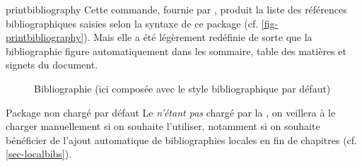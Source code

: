 \begin{docCommand}[doc description=\mandatory]{printbibliography}{}
  Cette commande, fournie par , produit la liste des
  références bibliographiques saisies selon la syntaxe de ce package (cf.
  \vref{fig-printbibliography}). Mais elle a été légèrement redéfinie de sorte
  que la bibliographie figure automatiquement dans les sommaire, table des
  matières et signets du document.
\end{docCommand}

\begin{figure}[htbp]
  \centering
  \caption[Bibliographie]{Bibliographie (ici composée avec le style
    bibliographique par défaut)}
  \label{fig-printbibliography}
\end{figure}

\begin{dbwarning}{Package  non chargé par défaut}{}
  Le  \emph{n'étant pas} chargé par la \yatCl, on veillera
  à le charger manuellement si on souhaite l'utiliser, notamment si on souhaite
  bénéficier de l'ajout automatique de bibliographies locales en fin de
  chapitres (cf. \vref{sec-localbibs}).
\end{dbwarning}

